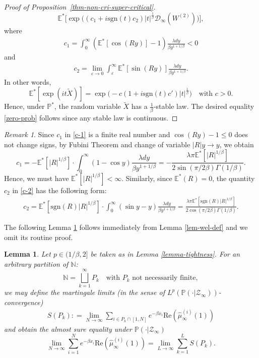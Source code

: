 \documentclass[12pt]{amsart}
\newtheorem{lemma}[theorem]{Lemma}
\theoremstyle{definition}
\theoremstyle{remark}
\newtheorem*{remark*}{Remark}
\newcommand{\N}{\mathbb{N}}
\newcommand{\E}{\mathbb{E}}
\newcommand{\PP}{\mathbb{P}}
\newcommand{\sgn}{\mathrm{sgn}}
\numberwithin{equation}{section}
\begin{document}
\begin{proof}[Proof of Proposition~\ref{thm-non-cri-super-critical}]
\[\E^*\big[ \exp\big( (c_1  + i \sgn(t) c_2)  |t|^{\frac{1}{\beta}}\mathscr{D}_\infty(W^{(2)}) \big)\big],
\]
where 
\begin{align}\label{c-1}
c_1  =  \int_{0}^\infty  ( \E^*[\cos (Ry) ]  -1) \frac{\lambda dy}{\beta y^{1+1/\beta}} <0
\end{align}
and 
\begin{align}\label{c-2}
c_2  =   \lim_{\varepsilon\to 0}   \int_{\varepsilon}^\infty \E^*[\sin (Ry) ]   \frac{\lambda dy}{\beta y^{1+1/\beta}}. 
\end{align}
In other words, 
\[
\E^*[\exp( it\widetilde{X})] = \exp\big( -c  (1 + i \sgn(t) c')  |t|^{\frac{1}{\beta}}\big) \quad \text{with $c> 0$}.  
\]
Hence, under $\PP^*$, the random variable  $\widetilde{X}$ has a $\frac{1}{\beta}$-stable law.  The desired equality \eqref{zero-prob} follows since  any stable law is  continuous. 
 \end{proof}
 
 
\begin{remark*}
Since $c_1$  in \eqref{c-1} is a finite real number and $\cos(Ry) -1\le 0$ does not change signs, by Fubini Theorem and change of variable $|R|y \to y$, we obtain 
\[
c_1 =     -  \E^*[|R|^{1/\beta}]  \cdot   \int_{0}^\infty  (1- \cos y) \frac{\lambda dy}{\beta y^{1+1/\beta}}    =   - \frac{ \lambda \pi  \E^*[|R|^{1/\beta}] } {  2  \sin (\pi /2 \beta)   \Gamma(1/\beta)   } . 
\]
Hence, we must have 
$
\E^*[|R|^{1/\beta}]<\infty.
$  Similarly, since $\E^*(R)=0$, the quantity  $c_2$ in \eqref{c-2} has the following form:
\begin{align*}
c_2 = \E^*[\sgn(R) |R|^{1/\beta}]  \cdot  \int_{0}^\infty  (\sin y - y)   \frac{\lambda dy}{\beta y^{1+1/\beta}}
=          \frac{\lambda \pi \E^*[\sgn(R) |R|^{1/\beta}]  }{ 2 \cos(\pi /2\beta)   \Gamma(1/\beta)}. 
\end{align*}
\end{remark*} 
 
 
 
 

The following Lemma \ref{lem-partition} follows immediately from   Lemma \ref{lem-wel-def} and we omit its routine proof. 

\begin{lemma}\label{lem-partition}
Let $p\in (1/\beta, 2]$ be taken as in Lemma \ref{lemma-tightness}. For an arbitrary partition of $\N$: 
\[
\N = \bigsqcup_{k=1}^\infty P_k \quad \text{with $P_k$ not necessarily finite}, 
\]
we may define the  martingale limits  (in the sense of $L^p (\PP(\cdot | \mathcal{Z}_\infty))$-convergence)
\begin{align}\label{def-Spk}
S(P_k): = \lim_{N\to\infty}\sum_{ i \in P_k \cap [1, N]} e^{-\beta x_i}   \mathrm{Re} (\widehat{\mu}^{(i)}_\infty(1))
\end{align}
and obtain the almost sure equality under $\PP(\cdot |\mathcal{Z}_\infty)$ 
\[
\lim_{N\to\infty}\sum_{i=1}^N e^{-\beta x_i}   \mathrm{Re} (\widehat{\mu}^{(i)}_\infty(1))   =  \lim_{L\to\infty} \sum_{k=1}^L  S(P_k). 
\]
\end{lemma}
 
\end{document}
